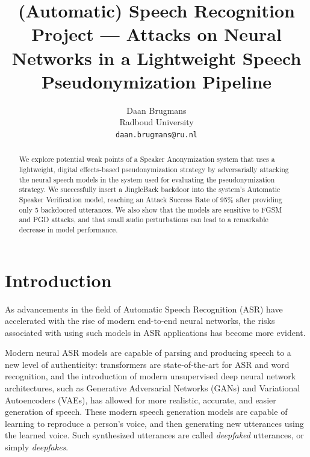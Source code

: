 \documentclass[11pt]{article}
\title{(Automatic) Speech Recognition Project --- Attacks on Neural Networks in a Lightweight Speech Pseudonymization Pipeline}
\author{Daan Brugmans \\
  Radboud University\\
  \texttt{daan.brugmans@ru.nl}
}
\begin{document}
\maketitle
        


\begin{abstract}
  We explore potential weak points of a Speaker Anonymization system that uses a lightweight, digital effects-based pseudonymization strategy by adversarially attacking the neural speech models in the system used for evaluating the pseudonymization strategy.
  We successfully insert a JingleBack backdoor into the system's Automatic Speaker Verification model, reaching an Attack Success Rate of 95\% after providing only 5 backdoored utterances.
  We also show that the models are sensitive to FGSM and PGD attacks, and that small audio perturbations can lead to a remarkable decrease in model performance.
\end{abstract}

\section{Introduction}
As advancements in the field of Automatic Speech Recognition (ASR) have accelerated with the rise of modern end-to-end neural networks, the risks associated with using such models in ASR applications has become more evident.

Modern neural ASR models are capable of parsing and producing speech to a new level of authenticity: transformers are state-of-the-art for ASR and word recognition, and the introduction of modern unsupervised deep neural network architectures, such as Generative Adversarial Networks (GANs) and Variational Autoencoders (VAEs), has allowed for more realistic, accurate, and easier generation of speech.
These modern speech generation models are capable of learning to reproduce a person's voice, and then generating new utterances using the learned voice.
Such synthesized utterances are called \textit{deepfaked} utterances, or simply \textit{deepfakes}.
\end{document}

